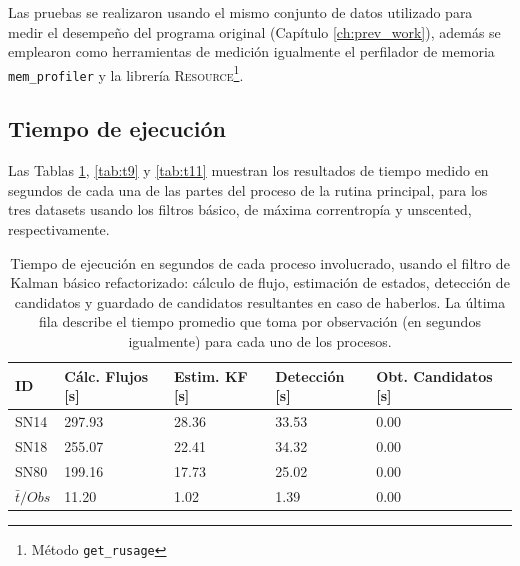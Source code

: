 Las pruebas se realizaron usando el mismo conjunto de datos utilizado para medir el desempe\~no del programa original 
(Cap\'itulo \ref{ch:prev_work}), adem\'as se emplearon como herramientas de medici\'on igualmente el perfilador de memoria \texttt{mem\_profiler} y la librer\'ia \textsc{Resource}\footnote{M\'etodo \texttt{get\_rusage}}.

\subsection{Tiempo de ejecuci\'on}
Las Tablas \ref{tab:t7}, \ref{tab:t9} y \ref{tab:t11} muestran los resultados de tiempo medido en segundos de cada una de las partes del proceso de la rutina principal, para los tres datasets usando los filtros b\'asico, de m\'axima correntrop\'ia y unscented, respectivamente. 

\begin{table}[h!]
\centering
\caption{Tiempo de ejecuci\'on en segundos de cada proceso involucrado, usando el filtro de Kalman b\'asico refactorizado: c\'alculo de flujo, estimaci\'on de estados, detecci\'on de candidatos y guardado de candidatos resultantes en caso de haberlos. La \'ultima fila describe el tiempo promedio que toma por observaci\'on (en segundos igualmente) para cada uno de los procesos. }
\begin{tabular}{|l|l|l|l|l|}
\hline
\textbf{ID} & \textbf{C\'alc. Flujos [s]} & \textbf{Estim. KF [s]} &  \textbf{Detecci\'on [s]}  & \textbf{Obt. Candidatos [s]}\\ \hline \hline
SN14        & 297.93            & 28.36        &  33.53 & 0.00 \\ \hline
SN18            & 255.07             & 22.41         & 34.32  & 0.00\\ \hline
SN80            & 199.16             & 17.73         &   25.02 & 0.00 \\ \hline \hline
$\bar{t}/Obs$ & 11.20 &  1.02 & 1.39 & 0.00\\\hline 
\end{tabular}
\label{tab:t7}
\end{table}

